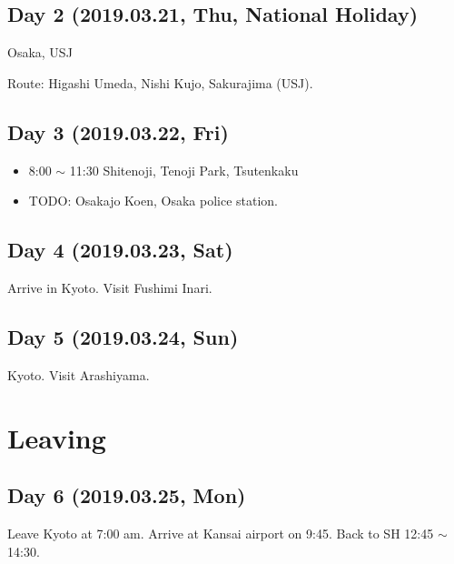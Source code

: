 \documentclass{article}
\begin{document}

\subsection{Day 2 (2019.03.21, Thu, National Holiday)}
Osaka, USJ

Route: Higashi Umeda, Nishi Kujo, Sakurajima (USJ).

\subsection{Day 3 (2019.03.22, Fri)}
\begin{itemize}
\item 8:00 $\sim$ 11:30 Shitenoji, Tenoji Park, Tsutenkaku
\item TODO: Osakajo Koen, Osaka police station.
\end{itemize}

\subsection{Day 4 (2019.03.23, Sat)}
Arrive in Kyoto.
Visit Fushimi Inari.

\subsection{Day 5 (2019.03.24, Sun)}
Kyoto. Visit Arashiyama.

\section{Leaving}
\subsection{Day 6 (2019.03.25, Mon)}
Leave Kyoto at 7:00 am.
Arrive at Kansai airport on 9:45.
Back to SH 12:45 $\sim $ 14:30.
\end{document}
